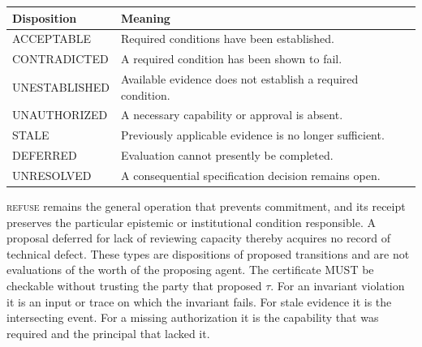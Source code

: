 \documentclass[11pt]{article}
\theoremstyle{remark}
\newcommand{\REFUSE}{\textsc{refuse}}
\begin{document}
\begin{center}
\small
\begin{tabular}{@{}>{\ttfamily}l>{\raggedright\arraybackslash}p{}@{}}
\toprule
\normalfont Disposition & Meaning\\
\midrule
ACCEPTABLE & Required conditions have been established.\\
CONTRADICTED & A required condition has been shown to fail.\\
UNESTABLISHED & Available evidence does not establish a required condition.\\
UNAUTHORIZED & A necessary capability or approval is absent.\\
STALE & Previously applicable evidence is no longer sufficient.\\
DEFERRED & Evaluation cannot presently be completed.\\
UNRESOLVED & A consequential specification decision remains open.\\
\bottomrule
\end{tabular}
\end{center}

\REFUSE{} remains the general operation that prevents commitment, and its receipt preserves the particular epistemic or institutional condition responsible. A proposal deferred for lack of reviewing capacity thereby acquires no record of technical defect. These types are dispositions of proposed transitions and are not evaluations of the worth of the proposing agent. The certificate MUST be checkable without trusting the party that proposed $\tau$. For an invariant violation it is an input or trace on which the invariant fails. For stale evidence it is the intersecting event. For a missing authorization it is the capability that was required and the principal that lacked it.
\end{document}
